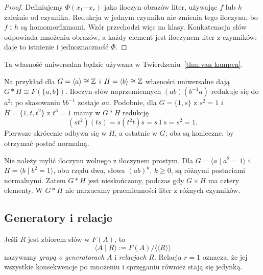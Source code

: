 \begin{proof}
Definiujemy $\Phi(x_1\cdots x_r)$ jako iloczyn obrazów liter,
używając $f$ lub $h$ zależnie od czynnika.
Redukcja w jednym czynniku nie zmienia tego iloczynu, bo
$f$ i $h$ są homomorfizmami. Wzór przechodzi więc na klasy.
Konkatenacja słów odpowiada mnożeniu obrazów, a każdy element
jest iloczynem liter z czynników; daje to istnienie i jednoznaczność $\Phi$.
\end{proof}

Ta własność uniwersalna będzie używana w
Twierdzeniu~\ref{thm:van-kampen}.

Na przykład dla $G=\langle a\rangle\cong\mathbb{Z}$
i $H=\langle b\rangle\cong\mathbb{Z}$ własności
uniwersalne dają $G*H\cong F(\{a,b\})$.
Iloczyn słów naprzemiennych
$(ab)(b^{-1}a)$ redukuje się do $a^2$:
po skasowaniu $bb^{-1}$ zostaje $aa$.
Podobnie, dla $G=\{1,s\}$ z $s^2=1$ i
$H=\{1,t,t^2\}$ z $t^3=1$ mamy w $G*H$ redukcję
\[
 (st^2)(ts)=s(t^2t)s=s\,1\,s=s^2=1.
\]
Pierwsze skrócenie odbywa się w $H$, a ostatnie w $G$;
oba są konieczne, by otrzymać postać normalną.

Nie należy mylić iloczynu wolnego z iloczynem prostym.
Dla $G=\langle a\mid a^2=1\rangle$ i
$H=\langle b\mid b^2=1\rangle$, obu rzędu dwa,
słowa $(ab)^k$, $k\geq0$, są różnymi postaciami normalnymi.
Zatem $G*H$ jest nieskończony, podczas gdy $G\times H$ ma
cztery elementy. W $G*H$ nie narzucamy przemienności liter
z różnych czynników.

\subsection*{Generatory i relacje}

\begin{definicja}
\label{def:prezentacja-grupy-5}
Jeśli $R$ jest zbiorem słów
w $F(A)$, to
\[
 \langle A\mid R\rangle
 :=F(A)/\langle\!\langle R\rangle\!\rangle
\]
nazywamy \emph{grupą o generatorach}
$A$ i \emph{relacjach} $R$.
Relacja $r=1$ oznacza, że jej
wszystkie konsekwencje po
mnożeniu i sprzęganiu również
stają się jedynką.
\end{definicja}

